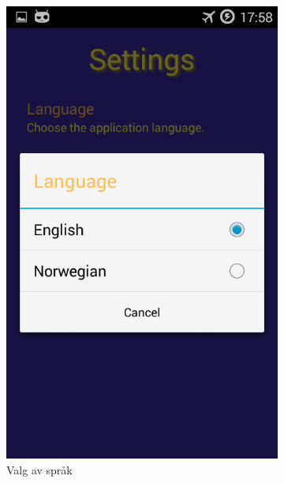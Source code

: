\begin{figure}[ht]
\begin{subfigure}[b]{0.3\textwidth}
        \includegraphics[width=\textwidth]{./img/bruksanvisning/8.png}
        \caption{Valg av språk}
        \label{fig:innstllinger_velg_sprak}
    \end{subfigure}
    \begin{subfigure}[b]{0.3\textwidth}

\end{subfigure}
\end{figure}
